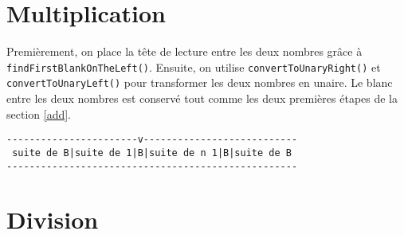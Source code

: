 \documentclass[a4paper,11pt]{article}
\begin{document}
\section{Multiplication}
Premièrement, on place la tête de lecture entre les deux nombres grâce à \texttt{findFirstBlankOnTheLeft()}.
Ensuite, on utilise \texttt{convertToUnaryRight()} et \texttt{convertToUnaryLeft()} pour transformer les deux nombres en unaire. Le blanc entre les deux nombres est conservé tout comme les deux premières étapes de la section \ref{add}.
\begin{verbatim}
-----------------------v---------------------------
 suite de B|suite de 1|B|suite de n 1|B|suite de B
---------------------------------------------------
\end{verbatim}
\section{Division}
\end{document}
